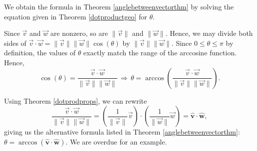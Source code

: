 \documentclass{ximera}
\begin{document}
\smallskip

We obtain the formula in Theorem \ref{anglebetweenvectorthm} by solving the equation given in Theorem \ref{dotproductgeo} for $\theta$.  

\smallskip

Since $\vec{v}$ and $\vec{w}$ are nonzero, so are $\| \vec{v} \|$ and $\|\vec{w}\|$.  Hence, we may divide both sides of $\vec{v} \cdot \vec{w} = \| \vec{v} \| \|\vec{w} \| \cos(\theta)$ by $\| \vec{v} \| \|\vec{w} \|$.  Since $0 \leq \theta \leq \pi$ by definition, the values of $\theta$ exactly match the range of the arccosine function.  Hence,  \[ \cos(\theta) = \frac{\vec{v} \cdot \vec{w}}{\| \vec{v} \| \|\vec{w} \|} \, \Rightarrow \,  \theta = \arccos\left( \frac{\vec{v} \cdot \vec{w}}{\| \vec{v} \| \|\vec{w} \|}\right).\]

\smallskip

Using Theorem \ref{dotprodprops}, we can rewrite \[ \frac{\vec{v} \cdot \vec{w}}{\| \vec{v} \| \|\vec{w} \|} = \left(\frac{1}{\|\vec{v}\|} \vec{v}\right) \cdot \left(\frac{1}{\|\vec{w}\|} \vec{w}\right) = \bm\hat{v} \cdot \bm\hat{w},\]  giving us the alternative formula listed in Theorem \ref{anglebetweenvectorthm}:  $\theta = \arccos(\bm\hat{v} \cdot \bm\hat{w})$.    We are overdue for an example.

\smallskip
\end{document}
